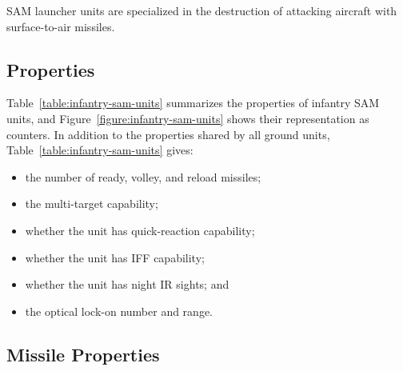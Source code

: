 \clearpage
{}

SAM launcher units are specialized in the destruction of attacking aircraft with surface-to-air missiles.

\subsection{Properties}

Table~\ref{table:infantry-sam-units} summarizes the properties of infantry SAM units, and
Figure~\ref{figure:infantry-sam-units} shows their representation as counters. In addition to the properties shared by all ground units, Table~\ref{table:infantry-sam-units} gives:
\begin{itemize}
    \item the number of ready, volley, and reload missiles;
    \item the multi-target capability;
    \item whether the unit has quick-reaction capability;
    \item whether the unit has IFF capability;
    \item whether the unit has night IR sights; and
    \item the optical lock-on number and range.
\end{itemize}


\subsection{Missile Properties}

